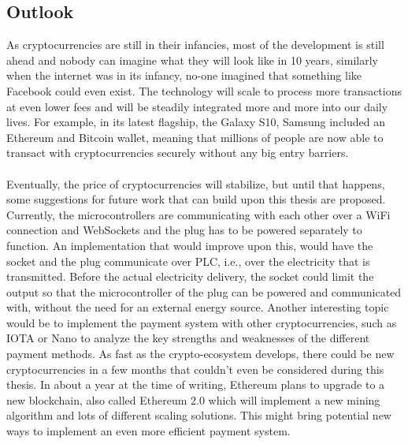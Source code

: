 \subsection{Outlook}
As cryptocurrencies are still in their infancies, most of the development is still ahead and nobody can imagine what they will look like in 10 years, similarly when the internet was in its infancy, no-one imagined that something like Facebook could even exist.
The technology will scale to process more transactions at even lower fees and will be steadily integrated more and more into our daily lives.
For example, in its latest flagship, the Galaxy S10, Samsung included an Ethereum and Bitcoin wallet, meaning that millions of people are now able to transact with cryptocurrencies securely without any big entry barriers.
\\\\
Eventually, the price of cryptocurrencies will stabilize, but until that happens, some suggestions for future work that can build upon this thesis are proposed.
Currently, the microcontrollers are communicating with each other over a WiFi connection and WebSockets and the plug has to be powered separately to function.
An implementation that would improve upon this, would have the socket and the plug communicate over PLC, i.e., over the electricity that is transmitted.
Before the actual electricity delivery, the socket could limit the output so that the microcontroller of the plug can be powered and communicated with, without the need for an external energy source.
Another interesting topic would be to implement the payment system with other cryptocurrencies, such as IOTA or Nano to analyze the key strengths and weaknesses of the different payment methods.
As fast as the crypto-ecosystem develops, there could be new cryptocurrencies in a few months that couldn’t even be considered during this thesis.
In about a year at the time of writing, Ethereum plans to upgrade to a new blockchain, also called Ethereum 2.0\cite{eth-2} which will implement a new mining algorithm and lots of different scaling solutions.
This might bring potential new ways to implement an even more efficient payment system.